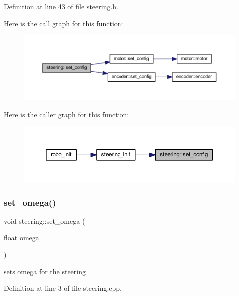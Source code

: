 Definition at line 43 of file steering.\+h.

Here is the call graph for this function\+:
\nopagebreak
\begin{figure}[H]
\begin{center}
\leavevmode
\includegraphics[width=350pt]{classsteering_a849eba14376618441a86e0ccdc1dc066_cgraph}
\end{center}
\end{figure}
Here is the caller graph for this function\+:
\nopagebreak
\begin{figure}[H]
\begin{center}
\leavevmode
\includegraphics[width=350pt]{classsteering_a849eba14376618441a86e0ccdc1dc066_icgraph}
\end{center}
\end{figure}
\mbox{\label{classsteering_a3f041a24795b6f4f886f46ca23dbc3e6}} 
\subsubsection{\texorpdfstring{set\_omega()}{set\_omega()}}
{\footnotesize\ttfamily void steering\+::set\+\_\+omega (\begin{DoxyParamCaption}\item[{float}]{omega }\end{DoxyParamCaption})}



sets omega for the steering 



Definition at line 3 of file steering.\+cpp.

